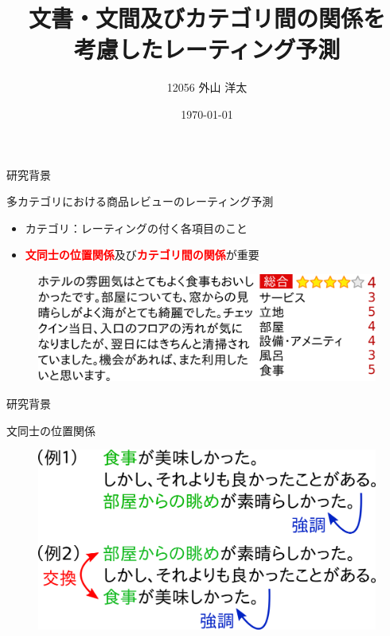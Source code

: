 \documentclass[aspectratio=43,unicode,10pt]{beamer}
\title{文書・文間及びカテゴリ間の関係を\\考慮したレーティング予測}
\institute{知能数理研究室}
\author{12056 外山 洋太}
\date{\today}
\newcommand{\fire}[1]{\textcolor{red}{\textbf{#1}}}
\begin{document}
\begin{frame}
\titlepage
\end{frame}

\begin{frame}{研究背景}{}
  \begin{block}{多カテゴリにおける商品レビューのレーティング予測}
    \begin{itemize}
      \item カテゴリ：レーティングの付く各項目のこと
      \item \fire{文同士の位置関係}及び\fire{カテゴリ間の関係}が重要
    \end{itemize}
  \end{block}
  \begin{figure}
    \includegraphics[width=0.9\linewidth]{fig/review.png}
  \end{figure}
\end{frame}

\begin{frame}{研究背景}{}
  \begin{block}{文同士の位置関係}
    \begin{figure}
      \includegraphics[width=0.8\linewidth]
                      {fig/relations_among_sentences.png}
    \end{figure}
  \end{block}
\end{frame}
\end{document}
